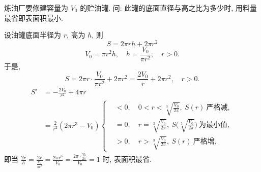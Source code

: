 \begin{example}\label{ex:3.5.16}
炼油厂要修建容量为 $V_{0}$ 的贮油罐. 问: 此罐的底面直径与高之比为多少时, 用料量最省即表面积最小.
\end{example}

\begin{solution}
设油罐底面半径为 $r$, 高为 $h$, 则
\[
S=2\pi rh+2\pi r^{2}
\]
\[
V_{0}=\pi r^{2}h,\quad h=\frac{V_{0}}{\pi r^{2}},\quad r>0.
\]
于是,
\[
S=2\pi r\cdot\frac{V_{0}}{\pi r^{2}}+2\pi r^{2}=\frac{2V_{0}}{r}+2\pi r^{2},\quad r>0.
\]
\[
\begin{aligned}
S'&=-\frac{2V_{0}}{r^{2}}+4\pi r\\
&=\frac{2}{r^{2}}(2\pi r^{3}-V_{0})
\left\{
\begin{aligned}
&<0,\quad 0<r<\sqrt[3]{\frac{V_{0}}{2\pi}},\ S(r)\ \text{严格减},\\
&=0,\quad r=\sqrt[3]{\frac{V_{0}}{2\pi}},\ S\Big(\sqrt[3]{\frac{V_{0}}{2\pi}}\Big)\ \text{为最小值},\\
&>0,\quad r>\sqrt[3]{\frac{V_{0}}{2\pi}},\ S(r)\ \text{严格增},
\end{aligned}
\right.
\end{aligned}
\]
即当 $\frac{2r}{h}=\frac{2r}{\frac{V_{0}}{\pi r^{2}}}=\frac{2\pi r^{3}}{V_{0}}=\frac{2\pi\cdot\frac{V_{0}}{2\pi}}{V_{0}}=1$ 时, 表面积最省.
\end{solution}

